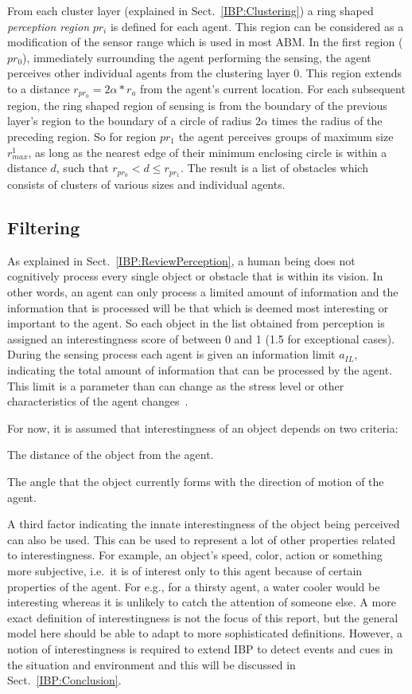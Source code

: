 From each cluster layer (explained in Sect.~\ref{IBP:Clustering}) a ring shaped {\em perception region} $pr_i$ is defined for each agent. This region can be considered as a modification of the sensor range which is used in most ABM.  In the first region ($pr_0$), immediately surrounding the agent performing the sensing, the agent perceives other individual agents from the clustering layer 0. This region extends to a distance $r_{pr_0} = 2\alpha *r_{a}$ from the agent's current location. For each subsequent region, the ring shaped region of sensing is from the boundary of the previous layer's region to the boundary of a circle of radius $2\alpha$ times the radius of the preceding region. So for region $pr_1$ the agent perceives groups of maximum size $r^{1}_{max}$, as long as the nearest edge of their minimum enclosing circle is within a distance $d$, such that $ r_{pr_0} < d \leq r_{pr_1}$. The result is a list of obstacles which consists of clusters of various sizes and individual agents.

\subsection{Filtering}
\label{IBP:Filtering}

As explained in Sect.~\ref{IBP:ReviewPerception}, a human being does not cognitively process every single object or obstacle that is within its vision. In other words, an agent can only process a limited amount of information and the information that is processed will be that which is deemed most interesting or important to the agent. So each object in the list obtained from perception is assigned an interestingness score of between 0 and 1 (1.5 for exceptional cases). During the sensing process each agent is given an information limit $a_{IL}$, indicating the total amount of information that can be processed by the agent. This limit is a parameter than can change as the stress level or other characteristics of the agent changes~\cite{Ozel:2001tn}.

For now, it is assumed that interestingness of an object depends on two criteria:
\begin{inparaenum}
\item The distance of the object from the agent.
\item The angle that the object currently forms with the direction of motion of the agent.
\end{inparaenum}
A third factor indicating the innate interestingness of the object being perceived can also be used. This can be used to represent a lot of other properties related to interestingness. For example, an object's speed, color, action or something more subjective, i.e.\ it is of interest only to this agent because of certain properties of the agent. For e.g., for a thirsty agent, a water cooler would be interesting whereas it is unlikely to catch the attention of someone else. A more exact definition of interestingness is not the focus of this report, but the general model here should be able to adapt to more sophisticated definitions. However, a notion of interestingness is required to extend IBP to detect events and cues in the situation and environment and this will be discussed in Sect.~\ref{IBP:Conclusion}.

